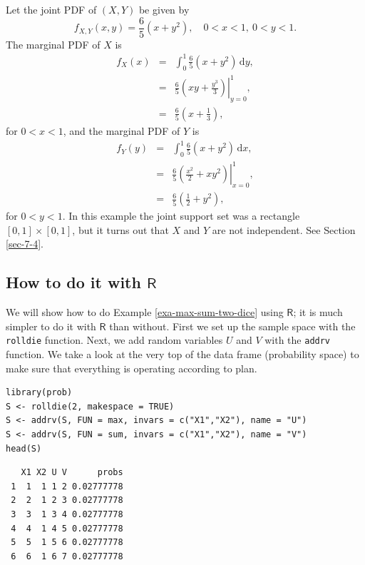 \documentclass[captions=tableheading]{scrbook}
\begin{document}
\begin{example}

Let the joint PDF of \((X,Y)\) be given by
\[
f_{X,Y}(x,y)=\frac{6}{5}\left(x+y^{2}\right),\quad 0 < x < 1,\ 0 < y < 1.
\]
The marginal PDF of \(X\) is
\begin{eqnarray*}
f_{X}(x) & = & \int_{0}^{1}\frac{6}{5}\left(x+y^{2}\right)\,\mathrm{d} y,\\
 & = & \left.\frac{6}{5}\left(xy+\frac{y^{3}}{3}\right)\right|_{y=0}^{1},\\
 & = & \frac{6}{5}\left(x+\frac{1}{3}\right),
\end{eqnarray*}
for \(0 < x < 1\), and the marginal PDF of \(Y\) is
\begin{eqnarray*}
f_{Y}(y) & = & \int_{0}^{1}\frac{6}{5}\left(x+y^{2}\right)\,\mathrm{d} x,\\
 & = & \left.\frac{6}{5}\left(\frac{x^{2}}{2}+xy^{2}\right)\right|_{x=0}^{1},\\
 & = & \frac{6}{5}\left(\frac{1}{2}+y^{2}\right),
\end{eqnarray*}
for \(0 < y < 1\). In this example the joint support set was a rectangle \([0,1]\times[0,1]\), but it turns out that \(X\) and \(Y\) are not independent. See Section \ref{sec-7-4}.
\end{example}
\subsection{How to do it with \(\mathsf{R}\)}
\label{sec-7-1-1}


We will show how to do Example \ref{exa-max-sum-two-dice} using \(\mathsf{R}\); it is much simpler to do it with \(\mathsf{R}\) than without. First we set up the sample space with the \texttt{rolldie} function. Next, we add random variables \(U\) and \(V\) with the \texttt{addrv} function. We take a look at the very top of the data frame (probability space) to make sure that everything is operating according to plan.




\lstset{language=R}
\begin{lstlisting}
library(prob)  
S <- rolldie(2, makespace = TRUE)
S <- addrv(S, FUN = max, invars = c("X1","X2"), name = "U")
S <- addrv(S, FUN = sum, invars = c("X1","X2"), name = "V")
head(S)
\end{lstlisting}

\begin{verbatim}
   X1 X2 U V      probs
 1  1  1 1 2 0.02777778
 2  2  1 2 3 0.02777778
 3  3  1 3 4 0.02777778
 4  4  1 4 5 0.02777778
 5  5  1 5 6 0.02777778
 6  6  1 6 7 0.02777778
\end{verbatim}
\end{document}
